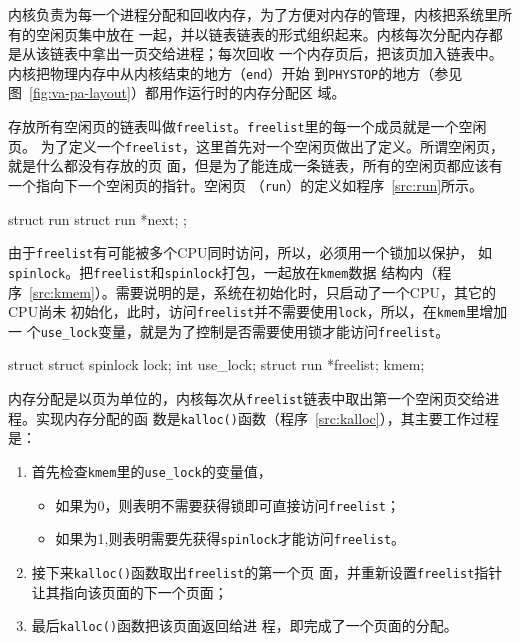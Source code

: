 \documentclass{swfcthesismscctex}
\begin{document}
内核负责为每一个进程分配和回收内存，为了方便对内存的管理，内核把系统里所有的空闲页集中放在
一起，并以链表链表的形式组织起来。内核每次分配内存都是从该链表中拿出一页交给进程；每次回收
一个内存页后，把该页加入链表中。内核把物理内存中从内核结束的地方（\texttt{end}）开始
到\texttt{PHYSTOP}的地方（参见图~\ref{fig:va-pa-layout}）都用作运行时的内存分配区
域。

存放所有空闲页的链表叫做\texttt{freelist}。\texttt{freelist}里的每一个成员就是一个空闲页。
为了定义一个\texttt{freelist}，这里首先对一个空闲页做出了定义。所谓空闲页，就是什么都没有存放的页
面，但是为了能连成一条链表，所有的空闲页都应该有一个指向下一个空闲页的指针。空闲页
（\texttt{run}）的定义如程序~\ref{src:run}所示。

\begin{listing}%
  \begin{codeblock}
\begin{ccode}
struct run {
  struct run *next;
};
\end{ccode}    
  \end{codeblock}
  \label{src:run}
\end{listing}

由于\texttt{freelist}有可能被多个CPU同时访问，所以，必须用一个锁加以保护，
如\texttt{spinlock}。把\texttt{freelist}和\texttt{spinlock}打包，一起放在\texttt{kmem}数据
结构内（程序~\ref{src:kmem}）。需要说明的是，系统在初始化时，只启动了一个CPU，其它的CPU尚未
初始化，此时，访问\texttt{freelist}并不需要使用\texttt{lock}，所以，在\texttt{kmem}里增加一
个\texttt{use\_lock}变量，就是为了控制是否需要使用锁才能访问\texttt{freelist}。

\begin{listing}%
  \begin{codeblock}
\begin{ccode}
struct {
  struct spinlock lock;
  int use_lock;
  struct run *freelist;
} kmem;
\end{ccode}    
  \end{codeblock}
  \label{src:kmem}
\end{listing}

内存分配是以页为单位的，内核每次从\texttt{freelist}链表中取出第一个空闲页交给进程。实现内存分配的函
数是\texttt{kalloc()}函数（程序~\ref{src:kalloc}），其主要工作过程是：
\begin{enumerate}
\item 首先检查\texttt{kmem}里的\texttt{use\_lock}的变量值，
  \begin{itemize}
  \item 如果为0，则表明不需要获得锁即可直接访问\texttt{freelist}；
  \item 如果为1,则表明需要先获得\texttt{spinlock}才能访问\texttt{freelist}。
  \end{itemize}
\item 接下来\texttt{kalloc()}函数取出\texttt{freelist}的第一个页
  面，并重新设置\texttt{freelist}指针让其指向该页面的下一个页面；
\item 最后\texttt{kalloc()}函数把该页面返回给进
  程，即完成了一个页面的分配。
\end{enumerate}
\end{document}
